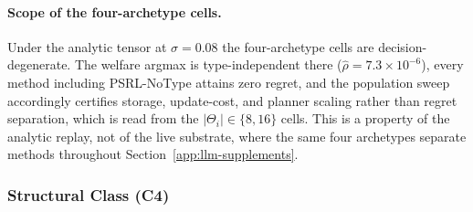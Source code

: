 \paragraph{Scope of the four-archetype cells.} Under the analytic tensor at $\sigma{=}0.08$ the four-archetype cells are decision-degenerate. The welfare argmax is type-independent there ($\hat\rho=7.3\times10^{-6}$), every method including PSRL-NoType attains zero regret, and the population sweep accordingly certifies storage, update-cost, and planner scaling rather than regret separation, which is read from the $|\Theta_i|\in\{8,16\}$ cells. This is a property of the analytic replay, not of the live substrate, where the same four archetypes separate methods throughout Section~\ref{app:llm-supplements}.

\begin{table}[H]
\centering
\caption{Frontier sweep at $|\Theta_i|{=}16$ (mean $\pm$ SEM over ten seeds, $K{=}50$). HARP and Joint-PSRL are pathwise identical wherever the joint tracker runs. The joint tracker leaves the sweep at $n{=}7$ by the $1$\,s update rule and at $n{=}8$ by the $4$\,GB rule.}
\label{tab:scaling-frontier}
\end{table}

\subsubsection{Structural Class (C4)}
\label{app:structural-boundary}
\label{app:hp-spgg-beyond-pf}
\label{app:wave2}


